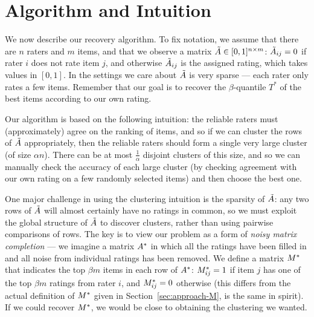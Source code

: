 \section{Algorithm and Intuition}
\label{sec:algorithm}



We now describe our recovery algorithm. To fix notation, we assume that 
there are $n$ raters and $m$ items, and that we observe a matrix 
$\tilde{A} \in [0,1]^{n \times m}$: 
$\tilde{A}_{ij} = 0$ if rater $i$ does not rate item $j$, and otherwise $\tilde{A}_{ij}$ 
is the assigned rating, which takes values 
in $[0,1]$. In the settings we 
care about $\tilde{A}$ is very sparse --- each rater only rates a few items.
Remember that our goal is to recover the $\beta$-quantile $T^*$ of the 
best items according to our own rating. 

Our algorithm is based on the following intuition: the reliable raters must 
(approximately) agree on the ranking of items, and so if we can cluster the 
rows of $\tilde{A}$ appropriately, then the reliable raters should form a single very large cluster 
(of size $\alpha n$). There can be at most $\frac{1}{\alpha}$ disjoint clusters of this size, and 
so we can manually check the accuracy of each large cluster (by checking agreement 
with our own rating on a few randomly selected items) and 
then choose the best one.

One major challenge in using the clustering intuition is the sparsity of 
$\tilde{A}$: any two rows of $\tilde{A}$ will almost certainly have no ratings in common, 
so we must exploit the global structure of $\tilde{A}$ to discover 
clusters, rather than using pairwise comparisons of rows.
The key is to view our problem as a form of \emph{noisy matrix completion} --- 
we imagine a matrix $A^*$ in which all the ratings have been filled in 
and all noise from individual ratings has been removed. We define a 
matrix $M^*$ that indicates the top $\beta m$ items in each row of $A^*$: 
$M^*_{ij} = 1$ if item $j$ has one of the top $\beta m$ ratings from rater $i$, 
and $M^*_{ij} = 0$ otherwise (this differs from the actual 
definition of $M^*$ given in Section~\ref{sec:approach-M}, is the same in spirit). If we could recover $M^*$, we would be 
close to obtaining the clustering we wanted.

